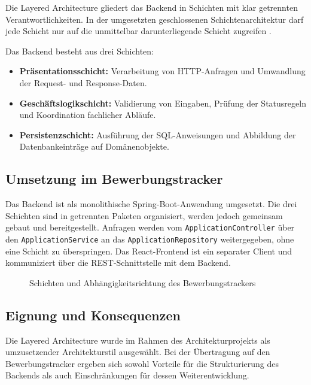 \documentclass[a4paper,11pt]{article}
\begin{document}
Die Layered Architecture gliedert das Backend in Schichten mit klar getrennten Verantwortlichkeiten.
In der umgesetzten geschlossenen Schichtenarchitektur darf jede Schicht nur auf die unmittelbar darunterliegende Schicht zugreifen \cite{richards2020}.

Das Backend besteht aus drei Schichten:

\begin{itemize}
  \item \textbf{Präsentationsschicht:} Verarbeitung von HTTP-Anfragen und Umwandlung der Request- und Response-Daten.
  \item \textbf{Geschäftslogikschicht:} Validierung von Eingaben, Prüfung der Statusregeln und Koordination fachlicher Abläufe.
  \item \textbf{Persistenzschicht:} Ausführung der SQL-Anweisungen und Abbildung der Datenbankeinträge auf Domänenobjekte.
\end{itemize}


\subsection{Umsetzung im Bewerbungstracker}

Das Backend ist als monolithische Spring-Boot-Anwendung umgesetzt.
Die drei Schichten sind in getrennten Paketen organisiert, werden jedoch gemeinsam gebaut und bereitgestellt.
Anfragen werden vom \texttt{ApplicationController} über den \texttt{ApplicationService} an das \texttt{ApplicationRepository} weitergegeben, ohne eine Schicht zu überspringen.
Das React-Frontend ist ein separater Client und kommuniziert über die REST-Schnittstelle mit dem Backend.

\vspace{0.5cm}

\begin{figure}[H]
\centering
\scalebox{0.9}{
  
}
\caption{Schichten und Abhängigkeitsrichtung des Bewerbungstrackers}
\label{fig:layers}
\end{figure}


\subsection{Eignung und Konsequenzen}

Die Layered Architecture wurde im Rahmen des Architekturprojekts als umzusetzender Architekturstil ausgewählt.
Bei der Übertragung auf den Bewerbungstracker ergeben sich sowohl Vorteile für die Strukturierung des Backends als auch Einschränkungen für dessen Weiterentwicklung.
\end{document}
